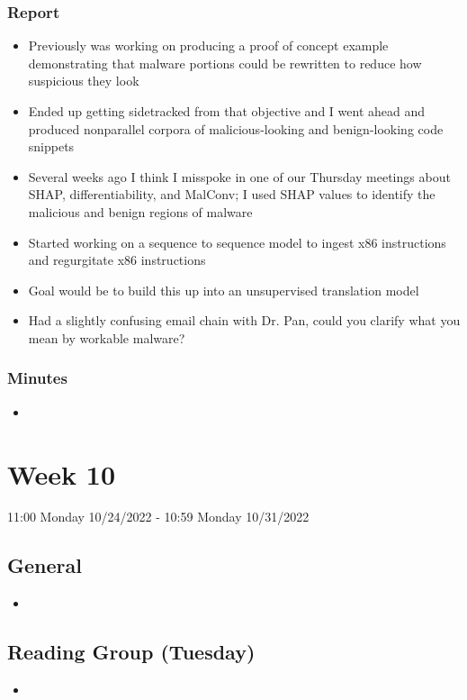 \documentclass{article}
\begin{document}
\subsubsection*{Report}
\begin{itemize}
	\item Previously was working on producing a proof of concept example demonstrating that malware portions could be rewritten to reduce how suspicious they look
	\item Ended up getting sidetracked from that objective and I went ahead and produced nonparallel corpora of malicious-looking and benign-looking code snippets
	\item Several weeks ago I think I misspoke in one of our Thursday meetings about SHAP, differentiability, and MalConv; I used SHAP values to identify the malicious and benign regions of malware
	\item Started working on a sequence to sequence model to ingest x86 instructions and regurgitate x86 instructions
	\item Goal would be to build this up into an unsupervised translation model
	\item Had a slightly confusing email chain with Dr. Pan, could you clarify what you mean by workable malware?
\end{itemize}
\subsubsection*{Minutes}
\begin{itemize}
	\item 
\end{itemize}

\pagebreak


\section*{Week 10}
11:00 Monday 10/24/2022 - 10:59 Monday 10/31/2022

\subsection*{General}
\begin{itemize}
	\item 
\end{itemize}

\subsection*{Reading Group (Tuesday)}
\begin{itemize}
	\item 
\end{itemize}
\end{document}

